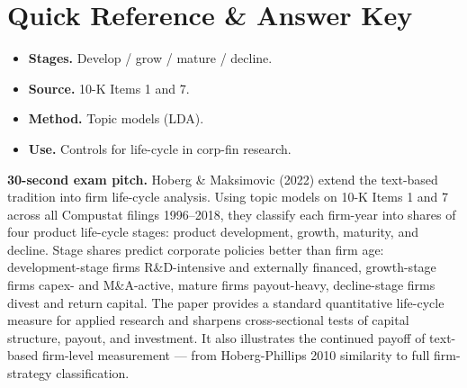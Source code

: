 \documentclass[11pt]{article}
\begin{document}
\section*{Quick Reference \& Answer Key}
\begin{answerbox}
\begin{itemize}
\item \textbf{Stages.} Develop / grow / mature / decline.
\item \textbf{Source.} 10-K Items 1 and 7.
\item \textbf{Method.} Topic models (LDA).
\item \textbf{Use.} Controls for life-cycle in corp-fin research.
\end{itemize}
\end{answerbox}

\begin{keybox}
\textbf{30-second exam pitch.} Hoberg \& Maksimovic (2022) extend the text-based tradition into firm life-cycle analysis. Using topic models on 10-K Items 1 and 7 across all Compustat filings 1996--2018, they classify each firm-year into shares of four product life-cycle stages: product development, growth, maturity, and decline. Stage shares predict corporate policies better than firm age: development-stage firms R\&D-intensive and externally financed, growth-stage firms capex- and M\&A-active, mature firms payout-heavy, decline-stage firms divest and return capital. The paper provides a standard quantitative life-cycle measure for applied research and sharpens cross-sectional tests of capital structure, payout, and investment. It also illustrates the continued payoff of text-based firm-level measurement --- from Hoberg-Phillips 2010 similarity to full firm-strategy classification.
\end{keybox}
\end{document}

